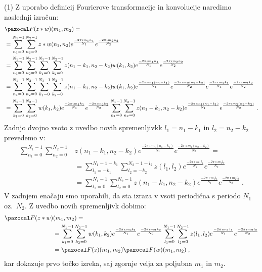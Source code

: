 %
\begin{dokaz} (1) Z uporabo definicij Fourierove transformacije in konvolucije naredimo naslednji izračun:
%
\begin{align*}
& \F(z \ast w)(m_1, m_2) = \\
&= \sum_{n_1 = 0}^{N_1 - 1} \sum_{n_2 = 0}^{N_2 - 1} z \ast w(n_1, n_2) e^{\frac{-2\pi \imath m_1n_1}{N_1}} e^{\frac{-2\pi \imath m_2n_2}{N_2}} \\
& = \sum_{n_1 = 0}^{N_1 - 1} \sum_{n_2 = 0}^{N_2 - 1} \sum_{k_1 = 0}^{N_1 - 1} \sum_{k_2 = 0}^{N_2 - 1} z(n_1 - k_1, n_2 - k_2) w(k_1, k_2) e^{\frac{-2\pi \imath m_1n_1}{N_1}} e^{\frac{-2\pi \imath m_2n_2}{N_2}} \\
& = \sum_{n_1 = 0}^{N_1 - 1} \sum_{n_2 = 0}^{N_2 - 1} \sum_{k_1 = 0}^{N_1 - 1} \sum_{k_2 = 0}^{N_2 - 1} z(n_1 - k_1, n_2 - k_2) w(k_1, k_2) e^{\frac{-2\pi \imath m_1(n_1-k_1)}{N_1}} e^{\frac{-2\pi \imath m_2(n_2-k_2)}{N_2}} e^{\frac{-2\pi \imath m_1k_1}{N_1}} e^{\frac{-2\pi \imath m_2k_2}{N_2}} \\
& = \sum_{k_1 = 0}^{N_1 - 1} \sum_{k_2 = 0}^{N_2 - 1} w(k_1, k_2) e^{\frac{-2\pi \imath m_1k_1}{N_1}} e^{\frac{-2\pi \imath m_2k_2}{N_2}} \sum_{n_1 = 0}^{N_1 - 1} \sum_{n_2 = 0}^{N_2 - 1} z(n_1 - k_1, n_2 - k_2) e^{\frac{-2\pi \imath m_1(n_1-k_1)}{N_1}} e^{\frac{-2\pi \imath m_2(n_2-k_2)}{N_2}} \;.
\end{align*}
%
Zadnjo dvojno vsoto z uvedbo novih spremenljivkk $l_1 = n_1 - k_1$ in $l_2 = n_2 - k_2$ prevedemo v:
%
\begin{align*}
\sum_{n_1 = 0}^{N_1 - 1} \sum_{n_2 = 0}^{N_2 - 1} & z(n_1 - k_1, n_2 - k_2) e^{\frac{-2\pi \imath m_1(n_1-k_1)}{N_1}} e^{\frac{-2\pi \imath m_2(n_2-k_2)}{N_2}} = \\
& = \sum_{l_1 = -k_1}^{N_1 - 1 - k_1} \sum_{l_2 = -k_2}^{N_2 - 1 - l_2} z(l_1, l_2) e^{\frac{-2\pi \imath m_1l_1}{N_1}} e^{\frac{-2\pi \imath m_2l_2}{N_2}} \\
& = \sum_{l_1 = 0}^{N_1 - 1} \sum_{l_2 = 0}^{N_2 - 1} z(n_1 - k_1, n_2 - k_2) e^{\frac{-2\pi \imath m_1l_1}{N_1}} e^{\frac{-2\pi \imath m_2l_2}{N_2}} \;.
\end{align*}
%
V zadnjem enačaju smo uporabili, da sta izraza v vsoti periodična s periodo $N_1$ oz.\ $N_2$. Z uvedbo novih spremenljivk dobimo:
%
\begin{align*}
\F(z \ast w)& (m_1, m_2) = \\
& = \sum_{k_1 = 0}^{N_1 - 1} \sum_{k_2 = 0}^{N_2 - 1} w(k_1, k_2) e^{\frac{-2\pi \imath m_1k_1}{N_1}} e^{\frac{-2\pi \imath m_2k_2}{N_2}} \sum_{l_1 = 0}^{N_1 - 1} \sum_{l_2 = 0}^{N_2 - 1} z(l_1, l_2) e^{\frac{-2\pi \imath m_1l_1}{N_1}} e^{\frac{-2\pi \imath m_2l_2}{N_2}} \\
& = \F(z)(m_1, m_2) \F(w)(m_1, m_2) \;,
\end{align*}
%
kar dokazuje prvo točko izreka, saj zgornje velja za poljubna $m_1$ in $m_2$.


\end{dokaz}
